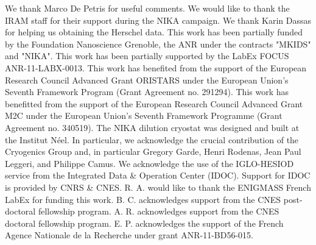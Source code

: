 \documentclass[twocolumn,traditabstract]{aa}
\begin{document}
\begin{acknowledgements}
We thank Marco De Petris for useful comments.
We would like to thank the IRAM staff for their support during the NIKA campaign.
We thank Karin Dassas for helping us obtaining the Herschel data.
This work has been partially funded by the Foundation Nanoscience Grenoble, the ANR under the contracts "MKIDS" and "NIKA". 
This work has been partially supported by the LabEx FOCUS ANR-11-LABX-0013. 
This work has benefited from the support of the European Research Council Advanced Grant ORISTARS under the European Union's Seventh Framework Program (Grant Agreement no. 291294).
This work has benefitted from the support of the European Research Council Advanced Grant M2C under the European Union’s Seventh Framework Programme (Grant Agreement no. 340519).
The NIKA dilution cryostat was designed and built at the Institut N\'eel. In particular, we acknowledge the crucial contribution of the Cryogenics Group and, in particular Gregory Garde, Henri Rodenas, Jean Paul Leggeri, and Philippe Camus. 
We acknowledge the use of the IGLO-HESIOD service from the Integrated Data \& Operation Center (IDOC). Support for IDOC is provided by CNRS \& CNES. 
R. A. would like to thank the ENIGMASS French LabEx for funding this work. 
B. C. acknowledges support from the CNES post-doctoral fellowship program. 
A. R. acknowledges support from the CNES doctoral fellowship program. 
E. P. acknowledges the support of the French Agence Nationale de la Recherche under grant ANR-11-BD56-015.
\end{acknowledgements}


\end{document}
